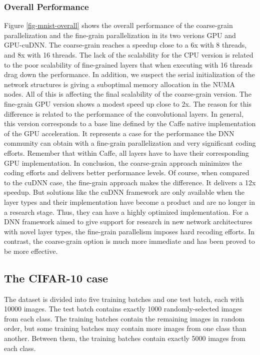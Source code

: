 \subsubsection{Overall Performance}
Figure \ref{fig-mnist-overall} shows the overall performance of
the coarse-grain parallelization and the fine-grain parallelization in 
its two verions GPU and GPU-cuDNN. The coarse-grain reaches a speedup 
close to a 6x with 8 threads, and 8x with 16 threads. The lack of 
the scalability for the CPU version is related to the poor scalability 
of fine-grained layers that when executing with 16 threads drag down 
the performance. In addition, we suspect the serial initialization of 
the network structures is giving a suboptimal memory allocation in 
the NUMA nodes. All of this is affecting the final scalability of 
the coarse-grain version. The fine-grain GPU version shows a 
modest speed up close to 2x. The reason for this difference is related 
to the performance of the convolutional layers. In general, this version 
corresponds to a base line defined by the Caffe native implementation 
of the GPU acceleration. It represents a case for the performance the DNN 
community can obtain with a fine-grain parallelization and very significant 
coding efforts. Remember that within Caffe, all layers have to have 
their corresponding GPU implementation. In conclusion, the coarse-grain 
approach minimizes the coding efforts and delivers better performance 
levels. Of course, when compared to the cuDNN case, the fine-grain 
approach makes the difference. It delivers a 12x speedup. But solutions 
like the cuDNN framework are only available when the layer types and 
their implementation have become a product and are no longer in a 
research stage. Thus, they can have a highly optimized implementation. 
For a DNN framework aimed to give support for 
research in new network architectures with novel layer types, 
the fine-grain parallelism imposes hard recoding efforts. In contrast, 
the coarse-grain option is much more immediate and has been proved to be 
more effective.



\subsection{The CIFAR-10 case}

The dataset is divided into five training batches and one test batch, each with 10000 images. The test batch contains exactly 1000 randomly-selected images from each class. The training batches contain the remaining images in random order, but some training batches may contain more images from one class than another. Between them, the training batches contain exactly 5000 images from each class. 
